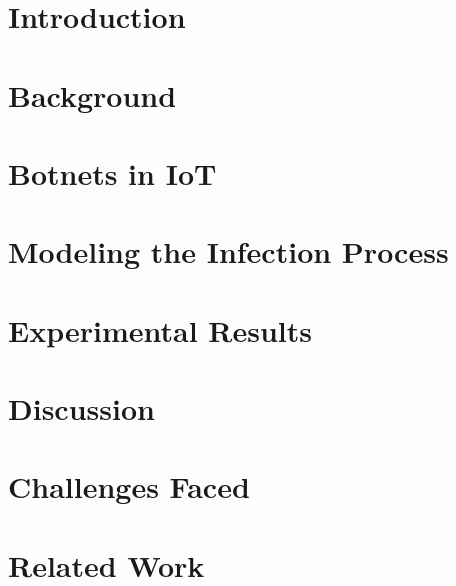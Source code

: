 \documentclass[conference]{IEEEtran}
\begin{document}
\section{Introduction}
\fontsize{10pt}{12pt}\selectfont
\label{sec:introduction}


\section{Background}
\fontsize{10pt}{12pt}\selectfont
\label{sec:background}


\section{Botnets in IoT}
\fontsize{10pt}{12pt}\selectfont
\label{sec:botnets}


\section{Modeling the Infection Process}
\fontsize{10pt}{12pt}\selectfont
\label{sec:modeling}


\section{Experimental Results}
\fontsize{10pt}{12pt}\selectfont
\label{sec:experimental_results}


\section{Discussion}
\fontsize{10pt}{12pt}\selectfont
\label{sec:discussion}


\section{Challenges Faced}
\fontsize{10pt}{12pt}\selectfont
\label{sec:challenges}


\section{Related Work}
\fontsize{10pt}{12pt}\selectfont
\label{sec:literature_review}

\end{document}
